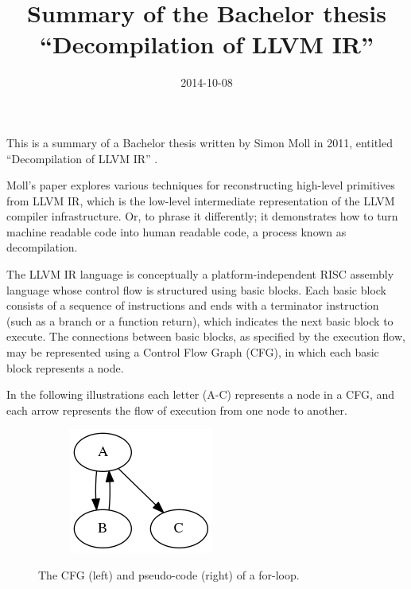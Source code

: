 \documentclass[12pt, a4paper]{article}
\title{Summary of the Bachelor thesis ``Decompilation of LLVM IR''}
\date{2014-10-08}
\begin{document}
\maketitle

This is a summary of a Bachelor thesis written by Simon Moll in 2011, entitled ``Decompilation of LLVM IR'' \cite{decomp_of_llvm}.

Moll's paper explores various techniques for reconstructing high-level primitives from LLVM IR, which is the low-level intermediate representation of the LLVM compiler infrastructure. Or, to phrase it differently; it demonstrates how to turn machine readable code into human readable code, a process known as decompilation.

The LLVM IR language is conceptually a platform-independent RISC assembly language whose control flow is structured using basic blocks. Each basic block consists of a sequence of instructions and ends with a terminator instruction (such as a branch or a function return), which indicates the next basic block to execute. The connections between basic blocks, as specified by the execution flow, may be represented using a Control Flow Graph (CFG), in which each basic block represents a node.

In the following illustrations each letter (A-C) represents a node in a CFG, and each arrow represents the flow of execution from one node to another.

\begin{figure}[H]
   \centering
   \begin{subfigure}[b]{0.2\textwidth}
      \includegraphics[width=\textwidth]{inc/pre_loop.png}
   \end{subfigure}
   \qquad
   \begin{subfigure}[b]{0.2\textwidth}
      
   \end{subfigure}
   \caption{The CFG (left) and pseudo-code (right) of a for-loop.}
\end{figure}
\end{document}
